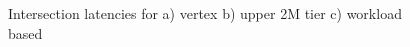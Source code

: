 \documentclass[11pt]{article}
\begin{document}
\begin{figure}
  \begin{center}
  \end{center}
  \label{fig:intersection}
  \caption{Intersection latencies for a) vertex b) upper 2M tier c) workload based}
\end{figure}
\end{document}

